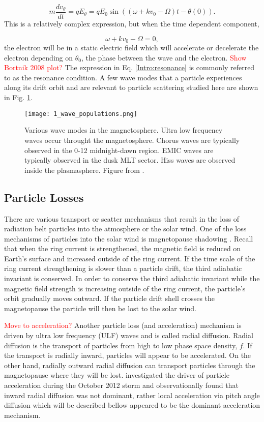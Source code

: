 \begin{equation}
m \frac{dv_\theta}{dt} = qE_\theta = qE_0 \sin{((\omega + kv_0 - \Omega)t - \theta(0))}.
\end{equation} This is a relatively complex expression, but when the time dependent component, 

\begin{equation} \label{Intro:resonance}
\omega + kv_0 - \Omega = 0,
\end{equation} the electron will be in a static electric field which will accelerate or decelerate the electron depending on $\theta_0$, the phase between the wave and the electron. \textcolor{red}{Show Bortnik 2008 plot?} The expression in Eq. \ref{Intro:resonance} is commonly referred to as the resonance condition. A few wave modes that a particle experiences along its drift orbit and are relevant to particle scattering studied here are shown in Fig. \ref{Intro:waves}.

\begin{figure}
\texttt{[image: 1\_wave\_populations.png]}
\caption{Various wave modes in the magnetosphere. Ultra low frequency waves occur throught the magnetosphere. Chorus waves are typically observed in the 0-12 midnight-dawn region. EMIC waves are typically observed in the dusk MLT sector. Hiss waves are observed inside the plasmasphere. Figure from \citet{Millan2007}.}
\label{Intro:waves}
\end{figure}

\subsection{Particle Losses}\label{Intro:losses}
There are various transport or scatter mechanisms that result in the loss of radiation belt particles into the atmosphere or the solar wind. One of the loss mechanisms of particles into the solar wind is magnetopause shadowing \citep{Ukhorskiy2006}. Recall that when the ring current is strengthened, the magnetic field is reduced on Earth's surface and increased outside of the ring current. If the time scale of the ring current strengthening is slower than a particle drift, the third adiabatic invariant is conserved. In order to conserve the third adiabatic invariant while the magnetic field strength is increasing outside of the ring current, the particle's orbit gradually moves outward. If the particle drift shell crosses the magnetopause the particle will then be lost to the solar wind.

\textcolor{red}{Move to acceleration?}
Another particle loss (and acceleration) mechanism is driven by ultra low frequency (ULF) waves and is called radial diffusion. Radial diffusion is the transport of particles from high to low phase space density, $f$. If the transport is radially inward, particles will appear to be accelerated. On the other hand, radially outward radial diffusion can transport particles through the magnetopause where they will be lost. \citet{Reeves2013} investigated the driver of particle acceleration during the October 2012 storm and observationally found that inward radial diffusion was not dominant, rather local acceleration via pitch angle diffusion which will be described bellow appeared to be the dominant acceleration mechanism.

